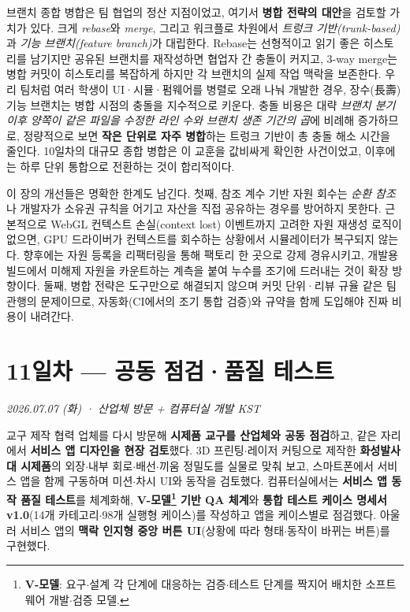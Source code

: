 브랜치 종합 병합은 팀 협업의 정산 지점이었고, 여기서 \textbf{병합 전략의 대안}을 검토할 가치가 있다. 크게 \emph{rebase}와 \emph{merge}, 그리고 워크플로 차원에서 \emph{트렁크 기반(trunk-based)}과 \emph{기능 브랜치(feature branch)}가 대립한다. Rebase는 선형적이고 읽기 좋은 히스토리를 남기지만 공유된 브랜치를 재작성하면 협업자 간 충돌이 커지고, 3-way merge는 병합 커밋이 히스토리를 복잡하게 하지만 각 브랜치의 실제 작업 맥락을 보존한다\cite{chacon2014progit}. 우리 팀처럼 여러 학생이 UI·시뮬·펌웨어를 병렬로 오래 나눠 개발한 경우, 장수(長壽) 기능 브랜치는 병합 시점의 충돌을 지수적으로 키운다. 충돌 비용은 대략 \emph{브랜치 분기 이후 양쪽이 같은 파일을 수정한 라인 수와 브랜치 생존 기간의 곱}에 비례해 증가하므로, 정량적으로 보면 \textbf{작은 단위로 자주 병합}하는 트렁크 기반이 총 충돌 해소 시간을 줄인다. 10일차의 대규모 종합 병합은 이 교훈을 값비싸게 확인한 사건이었고, 이후에는 하루 단위 통합으로 전환하는 것이 합리적이다.

이 장의 개선들은 명확한 한계도 남긴다. 첫째, 참조 계수 기반 자원 회수는 \emph{순환 참조}나 개발자가 소유권 규칙을 어기고 자산을 직접 공유하는 경우를 방어하지 못한다. 근본적으로 WebGL 컨텍스트 손실(context lost) 이벤트까지 고려한 자원 재생성 로직이 없으면, GPU 드라이버가 컨텍스트를 회수하는 상황에서 시뮬레이터가 복구되지 않는다. 향후에는 자원 등록을 리팩터링\cite{fowler2018refactoring}을 통해 팩토리 한 곳으로 강제 경유시키고, 개발용 빌드에서 미해제 자원을 카운트하는 계측을 붙여 누수를 조기에 드러내는 것이 확장 방향이다. 둘째, 병합 전략은 도구만으로 해결되지 않으며 커밋 단위·리뷰 규율 같은 팀 관행\cite{hunt1999pragmatic}의 문제이므로, 자동화(CI에서의 조기 통합 검증)와 규약을 함께 도입해야 진짜 비용이 내려간다.

\chapter{11일차 — 공동 점검·품질 테스트}
\textit{2026.07.07 (화) · 산업체 방문 + 컴퓨터실 개발 KST}

\begin{summarybox}
교구 제작 협력 업체를 다시 방문해 \textbf{시제품 교구를 산업체와 공동 점검}하고, 같은 자리에서
\textbf{서비스 앱 디자인을 현장 검토}했다. 3D 프린팅$\cdot$레이저 커팅으로 제작한 \textbf{화성발사대
시제품}의 외장$\cdot$내부 회로$\cdot$배선$\cdot$끼움 정밀도를 실물로 맞춰 보고, 스마트폰에서 서비스
앱을 함께 구동하며 미션$\cdot$차시 UI와 동작을 검토했다. 컴퓨터실에서는 \textbf{서비스 앱 동작 품질
테스트}를 체계화해, \textbf{V-모델\footnote{\textbf{V-모델}: 요구$\cdot$설계 각 단계에 대응하는 검증$\cdot$테스트 단계를 짝지어 배치한 소프트웨어 개발$\cdot$검증 모델.} 기반 QA 체계}와 \textbf{통합 테스트 케이스 명세서 v1.0}(14개
카테고리$\cdot$98개 실행형 케이스)를 작성하고 앱을 케이스별로 점검했다. 아울러 서비스 앱의
\textbf{맥락 인지형 중앙 버튼 UI}(상황에 따라 형태$\cdot$동작이 바뀌는 버튼)를 구현했다.
\end{summarybox}

